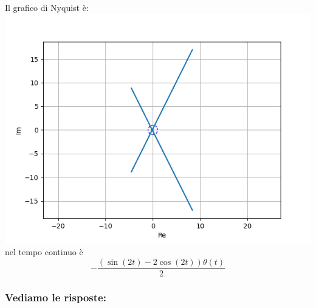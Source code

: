 \documentclass{article}
\begin{document}
Il grafico di Nyquist è:
\includegraphics[scale = 0.5]{figures/nyquist_6782183.png}nel tempo continuo è \[ - \frac{\left(\sin{\left(2 t \right)} - 2 \cos{\left(2 t \right)}\right) \theta\left(t\right)}{2} \]
\subsubsection{Vediamo le risposte:} 
\end{document}
